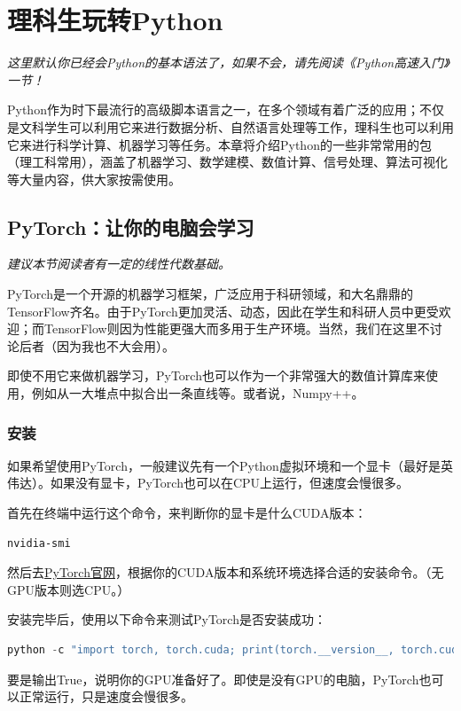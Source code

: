 \documentclass[../main.tex]{subfiles}
\begin{document}
\chapter{理科生玩转Python}\label{chap:python-advanced}
\begin{flushright}
    \emph{这里默认你已经会Python的基本语法了，如果不会，请先阅读《Python高速入门》一节！}
\end{flushright}

Python作为时下最流行的高级脚本语言之一，在多个领域有着广泛的应用；不仅是文科学生可以利用它来进行数据分析、自然语言处理等工作，理科生也可以利用它来进行科学计算、机器学习等任务。本章将介绍Python的一些非常常用的包（理工科常用），涵盖了机器学习、数学建模、数值计算、信号处理、算法可视化等大量内容，供大家按需使用。

\section{PyTorch：让你的电脑会学习}
\begin{flushright}
    \emph{建议本节阅读者有一定的线性代数基础。}
\end{flushright}

PyTorch是一个开源的机器学习框架，广泛应用于科研领域，和大名鼎鼎的TensorFlow齐名。由于PyTorch更加灵活、动态，因此在学生和科研人员中更受欢迎；而TensorFlow则因为性能更强大而多用于生产环境。当然，我们在这里不讨论后者（因为我也不大会用）。

即使不用它来做机器学习，PyTorch也可以作为一个非常强大的数值计算库来使用，例如从一大堆点中拟合出一条直线等。或者说，Numpy++。

\subsection{安装}

如果希望使用PyTorch，一般建议先有一个Python虚拟环境和一个显卡（最好是英伟达）。如果没有显卡，PyTorch也可以在CPU上运行，但速度会慢很多。

首先在终端中运行这个命令，来判断你的显卡是什么CUDA版本：
\begin{lstlisting}[language=bash]
nvidia-smi
\end{lstlisting}

然后去\href{https://pytorch.org/get-started/locally/}{PyTorch官网}，根据你的CUDA版本和系统环境选择合适的安装命令。（无GPU版本则选CPU。）

安装完毕后，使用以下命令来测试PyTorch是否安装成功：
\begin{lstlisting}[language=python]
python -c "import torch, torch.cuda; print(torch.__version__, torch.cuda.is_available())"
\end{lstlisting}
要是输出True，说明你的GPU准备好了。即使是没有GPU的电脑，PyTorch也可以正常运行，只是速度会慢很多。
\end{document}
